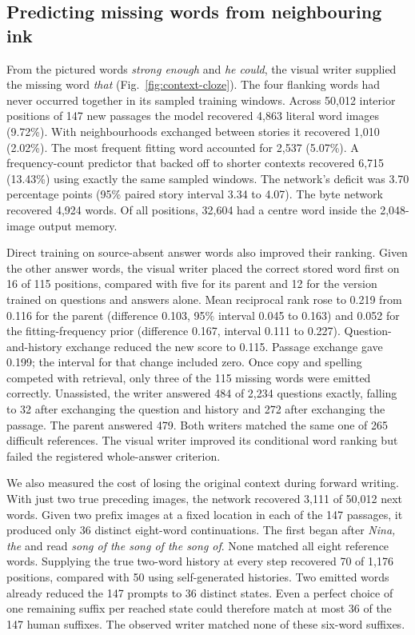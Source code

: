 \subsection*{Predicting missing words from neighbouring ink}
From the pictured words \emph{strong enough} and \emph{he could}, the visual writer supplied the missing word \emph{that} (Fig.~\ref{fig:context-cloze}). The four flanking words had never occurred together in its sampled training windows. Across 50,012 interior positions of 147 new passages the model recovered 4,863 literal word images (9.72\%). With neighbourhoods exchanged between stories it recovered 1,010 (2.02\%). The most frequent fitting word accounted for 2,537 (5.07\%). A frequency-count predictor that backed off to shorter contexts recovered 6,715 (13.43\%) using exactly the same sampled windows. The network's deficit was 3.70 percentage points (95\% paired story interval 3.34 to 4.07). The byte network recovered 4,924 words. Of all positions, 32,604 had a centre word inside the 2,048-image output memory.

Direct training on source-absent answer words also improved their ranking. Given the other answer words, the visual writer placed the correct stored word first on 16 of 115 positions, compared with five for its parent and 12 for the version trained on questions and answers alone. Mean reciprocal rank rose to 0.219 from 0.116 for the parent (difference 0.103, 95\% interval 0.045 to 0.163) and 0.052 for the fitting-frequency prior (difference 0.167, interval 0.111 to 0.227). Question-and-history exchange reduced the new score to 0.115. Passage exchange gave 0.199; the interval for that change included zero. Once copy and spelling competed with retrieval, only three of the 115 missing words were emitted correctly. Unassisted, the writer answered 484 of 2,234 questions exactly, falling to 32 after exchanging the question and history and 272 after exchanging the passage. The parent answered 479. Both writers matched the same one of 265 difficult references. The visual writer improved its conditional word ranking but failed the registered whole-answer criterion.

We also measured the cost of losing the original context during forward writing. With just two true preceding images, the network recovered 3,111 of 50,012 next words. Given two prefix images at a fixed location in each of the 147 passages, it produced only 36 distinct eight-word continuations. The first began after \emph{Nina, the} and read \emph{song of the song of the song of}. None matched all eight reference words. Supplying the true two-word history at every step recovered 70 of 1,176 positions, compared with 50 using self-generated histories. Two emitted words already reduced the 147 prompts to 36 distinct states. Even a perfect choice of one remaining suffix per reached state could therefore match at most 36 of the 147 human suffixes. The observed writer matched none of these six-word suffixes.
